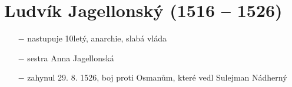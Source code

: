 \documentclass{article}
\begin{document}
\section*{Ludvík Jagellonský (1516 – 1526)}
\begin{itemize}
    \vspace{-0.5em}
    \setlength\itemsep{0.15em}
    \item[$-$] nastupuje 10letý, anarchie, slabá vláda
    \item[$-$] sestra Anna Jagellonská
    \item[$-$] zahynul 29. 8. 1526, boj proti Osmanům, které vedl Sulejman Nádherný

\end{itemize}
\end{document}
